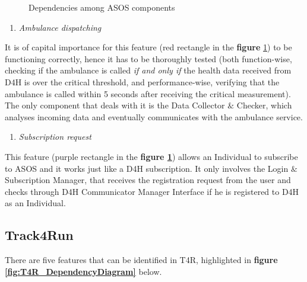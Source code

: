     \begin{figure}[h]
        \centering
        \caption{Dependencies among ASOS components}
        \label{fig:ASOS_DependencyDiagram}
    \end{figure}
    
    \begin{enumerate}
        \item \emph{Ambulance dispatching}
    \end{enumerate}
    It is of capital importance for this feature (red rectangle in the \textbf{figure} \ref{fig:ASOS_DependencyDiagram}) to be functioning correctly, hence it has to be thoroughly tested (both function-wise, checking if the ambulance is called \emph{if and only if} the health data received from D4H is over the critical threshold, and performance-wise, verifying that the ambulance is called within 5 seconds after receiving the critical measurement). The only component that deals with it is the Data Collector $\&$ Checker, which analyses incoming data and eventually communicates with the ambulance service. 
    
    \newpage
    \begin{enumerate} [resume]
        \item \emph{Subscription request}
    \end{enumerate}
    This feature (purple rectangle in the \textbf{figure \ref{fig:ASOS_DependencyDiagram}}) allows an Individual to subscribe to ASOS and it works just like a D4H subscription. It only involves the Login $\&$ Subscription Manager, that receives the registration request from the user and checks through D4H Communicator Manager Interface if he is registered to D4H as an Individual.

\subsection{Track4Run}
    There are five features that can be identified in T4R, highlighted in \textbf{figure \ref{fig:T4R_DependencyDiagram}} below.
    
